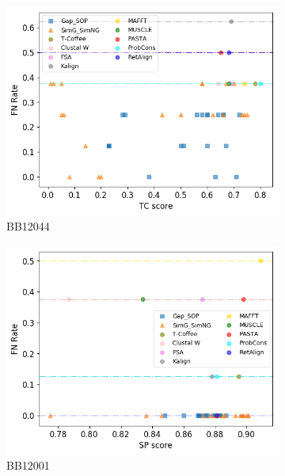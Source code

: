 \begin{figure}[!htbp]
\begin{adjustwidth}{-1cm}{-1cm}
\begin{subfigure}{0.22\textwidth}
			\includegraphics[width=\columnwidth]{Figure/summary/precomputedInit/Balibase/BB12044_fnrate_vs_tc_2}
			\caption{BB12044}
		\end{subfigure}
		\begin{subfigure}{0.22\textwidth}
			\includegraphics[width=\columnwidth]{Figure/summary/precomputedInit/Balibase/BB12001_fnrate_vs_sp_2}
			\caption{BB12001}
		\end{subfigure}	
		\begin{subfigure}{0.22\textwidth}

\end{subfigure}
\end{adjustwidth}
\end{figure}
